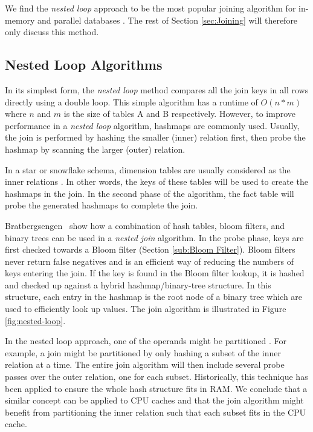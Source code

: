 We find the \textit{nested loop} approach to be the most popular joining algorithm for in-memory and parallel databases \cite{Boncz2002-yj}. The rest of Section \ref{sec:Joining} will therefore only discuss this method.

\subsection{Nested Loop Algorithms}
\label{sub:Nested Loop Algorithms}

In its simplest form, the \textit{nested loop} method compares all the join keys  in all rows directly using a double loop. This simple algorithm has a runtime of $O(n*m)$ where $n$ and $m$ is the size of tables A and B respectively. However, to improve performance in a \textit{nested loop} algorithm, hashmaps are commonly used. Usually, the join is performed by hashing the smaller (inner) relation first, then probe the hashmap by scanning the larger (outer) relation. 

In a star or snowflake schema, dimension tables are usually considered as the inner relations \cite{Barber2012-xt, Raman2013-em}. In other words, the keys of these tables will be used to create the hashmaps in the join. In the second phase of the algorithm, the fact table will probe the generated hashmaps to complete the join. 


Bratbergsengen \ea~show how a combination of hash tables, bloom filters, and binary trees can be used in a \textit{nested join} algorithm. In the probe phase, keys are first checked towards a Bloom filter (Section \ref{sub:Bloom Filter}). Bloom filters never return false negatives and is an efficient way of reducing the numbers of keys entering the join. If the key is found in the Bloom filter lookup, it is hashed and checked up against a hybrid hashmap/binary-tree structure. In this structure, each entry in the hashmap is the root node of a binary tree which are used to efficiently look up values. The join algorithm is illustrated in Figure \ref{fig:nested-loop}.

In the nested loop approach, one of the operands might be partitioned \cite{Bratbergsengen2015-ed}. For example, a join might be partitioned by only hashing a subset of the inner relation at a time. The entire join algorithm will then include several probe passes over the outer relation, one for each subset. Historically, this technique has been applied to ensure the whole hash structure fits in RAM. We conclude that a similar concept can be applied to CPU caches and that the join algorithm might benefit from partitioning the inner relation such that each subset fits in the CPU cache.

